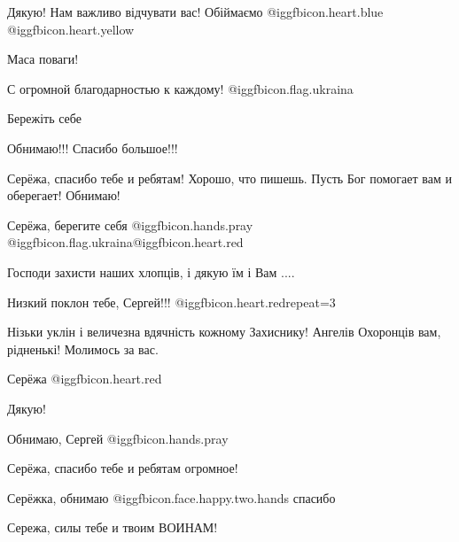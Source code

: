 \begin{itemize}
Дякую! Нам важливо відчувати вас! Обіймаємо @igg{fbicon.heart.blue}  @igg{fbicon.heart.yellow} 

Маса поваги!

С огромной благодарностью к каждому! @igg{fbicon.flag.ukraina}

Бережіть себе

Обнимаю!!! Спасибо большое!!!

Серёжа, спасибо тебе и ребятам! Хорошо, что пишешь. Пусть Бог помогает вам и оберегает! Обнимаю!

Серёжа, берегите себя  @igg{fbicon.hands.pray} @igg{fbicon.flag.ukraina}@igg{fbicon.heart.red}

Господи захисти наших хлопців, і дякую їм і Вам ....

Низкий поклон тебе, Сергей!!! @igg{fbicon.heart.red}{repeat=3}

Нізьки уклін і величезна вдячність кожному Захиснику! Ангелів Охоронців вам, рідненькі! Молимось за вас.

Серёжа @igg{fbicon.heart.red}

Дякую!

Обнимаю, Сергей  @igg{fbicon.hands.pray} 

Серёжа, спасибо тебе и ребятам огромное!

Серёжка, обнимаю  @igg{fbicon.face.happy.two.hands} спасибо

Сережа, силы тебе и твоим ВОИНАМ!

\end{itemize} %
